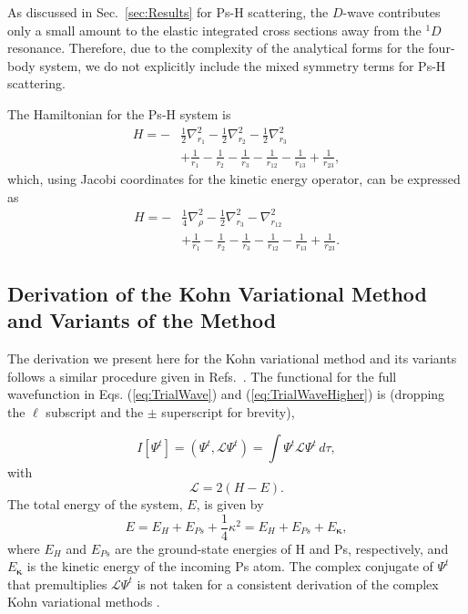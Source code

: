 \documentclass[preprint,showpacs,showkeys,preprintnumbers,amsmath,amssymb,longbibliography,pra,aps]{revtex4-1}
\begin{document}
{As discussed in Sec.~\ref{sec:Results} for Ps-H scattering, the $D$-wave
contributes only a small amount to the elastic integrated cross sections away 
from the $^1D$ resonance. Therefore, due to the complexity of the analytical 
forms for the four-body system, we do not explicitly include the mixed 
symmetry terms for Ps-H scattering.


The Hamiltonian for the Ps-H system is
\begin{align}
H = -&\frac{1}{2} \nabla_{r_1}^2 - \frac{1}{2} \nabla_{r_2}^2 - \frac{1}{2}
  \nabla_{r_3}^2  \nonumber \\
&+ \frac{1}{r_1} - \frac{1}{r_2} - \frac{1}{r_3} - \frac{1}{r_{12}} -
  \frac{1}{r_{13}}+\frac {1}{r_{23}},
\label{eq:Hamiltonian1}
\end{align}
which, using Jacobi coordinates for the kinetic energy operator, can be
expressed as
\begin{align}
H = -&\frac{1}{4} \nabla_{\rho}^2 - \frac{1}{2} \nabla_{r_3}^2 -
  \nabla_{r_{12}}^2  \nonumber \\
&+ \frac{1}{r_1} - \frac{1}{r_2} - \frac{1}{r_3} - \frac{1}{r_{12}} -
  \frac{1}{r_{13}}+\frac{1}{r_{23}}.
\label{eq:Hamiltonian2}
\end{align}


\subsection{Derivation of the Kohn Variational Method and Variants of the Method}
\label{sec:Kohn}
The derivation we present here for the Kohn variational method and its variants
follows a similar procedure given in
Refs.~\cite{Lucchese1989,Cooper2010,Armour1991,VanReethThesis}.
The functional for the full wavefunction in Eqs. (\ref{eq:TrialWave}) and
(\ref{eq:TrialWaveHigher}) is (dropping the $\ell$ subscript and the $\pm$ 
superscript for brevity),

\begin{equation}
I[\Psi^t] = \left(\Psi^t, \mathcal{L} \Psi^t \right) = \int \Psi^t \mathcal{L}
  \Psi^t \,d\tau,
\label{eq:IlDefPsi}
\end{equation}
with
\begin{equation}
\mathcal{L} = 2(H - E).
\label{eq:LDef}
\end{equation}
The total energy of the system, $E$, is given by
\begin{equation}
\label{eq:TotalEnergy}
E = E_H + E_{Ps} + \frac{1}{4}\kappa^2 = E_H + E_{Ps} + E_{\bm \kappa},
\end{equation}
where $E_H$ and $E_{Ps}$ are the ground-state energies of H and Ps, 
respectively,
and $E_{\bm \kappa}$ is the kinetic energy of the incoming Ps atom.
The complex conjugate of $\Psi^t$ that premultiplies $\mathcal{L} \Psi^t$
is not taken for a consistent derivation of the complex Kohn variational
methods \cite{Cooper2010,Lucchese1989}.

}
\end{document}
